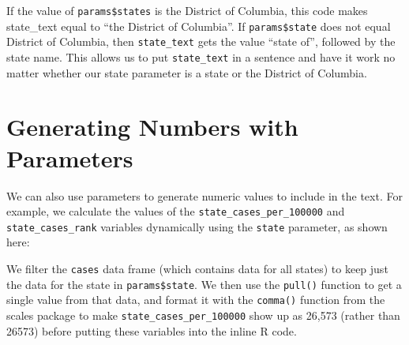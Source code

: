 \documentclass[
]{book}
\newenvironment{Shaded}{\begin{snugshade}}{\end{snugshade}}
\newcommand{\FunctionTok}[1]{\textcolor[rgb]{0.13,0.29,0.53}{\textbf{#1}}}
\newcommand{\NormalTok}[1]{#1}
\newcommand{\OtherTok}[1]{\textcolor[rgb]{0.56,0.35,0.01}{#1}}
\newcommand{\SpecialCharTok}[1]{\textcolor[rgb]{0.81,0.36,0.00}{\textbf{#1}}}
\begin{document}
If the value of \texttt{params\$states} is the District of Columbia, this code makes state\_text equal to ``the District of Columbia''. If \texttt{params\$state} does not equal District of Columbia, then \texttt{state\_text} gets the value ``state of'', followed by the state name. This allows us to put \texttt{state\_text} in a sentence and have it work no matter whether our state parameter is a state or the District of Columbia.

\hypertarget{generating-numbers-with-parameters}{%
\section*{Generating Numbers with Parameters}\label{generating-numbers-with-parameters}}

We can also use parameters to generate numeric values to include in the text. For example, we calculate the values of the \texttt{state\_cases\_per\_100000} and \texttt{state\_cases\_rank} variables dynamically using the \texttt{state} parameter, as shown here:

\begin{Shaded}
\end{Shaded}

We filter the \texttt{cases} data frame (which contains data for all states) to keep just the data for the state in \texttt{params\$state}. We then use the \texttt{pull()} function to get a single value from that data, and format it with the \texttt{comma()} function from the scales package to make \texttt{state\_cases\_per\_100000} show up as 26,573 (rather than 26573) before putting these variables into the inline R code.
\end{document}

